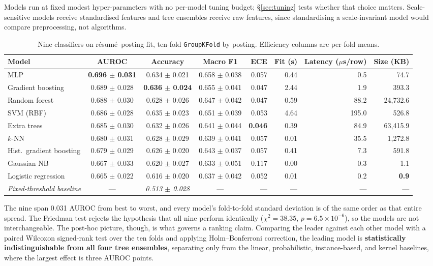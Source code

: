 Models run at fixed modest hyper-parameters with no per-model tuning budget;
\S\ref{sec:tuning} tests whether that choice matters. Scale-sensitive models
receive standardised features and tree ensembles receive raw features, since standardising a scale-invariant model would compare preprocessing, not algorithms.

\begin{table}[t]
\caption{Nine classifiers on résumé--posting fit, ten-fold \texttt{GroupKFold} by
posting. Efficiency columns are per-fold means.}
\label{tab:ninemodel}
\small
\begin{tabular}{@{}lcccrrrr@{}}
\toprule
Model & AUROC & Accuracy & Macro F1 & ECE & Fit (s) & Latency ($\mu$s/row) & Size (KB) \\
\midrule
MLP                      & \textbf{0.696 $\pm$ 0.031} & 0.634 $\pm$ 0.021 & 0.658 $\pm$ 0.038 & 0.057 & 0.44 & 0.5 & 74.7 \\
Gradient boosting        & 0.689 $\pm$ 0.028 & \textbf{0.636 $\pm$ 0.024} & 0.655 $\pm$ 0.041 & 0.047 & 2.44 & 1.9 & 393.3 \\
Random forest            & 0.688 $\pm$ 0.030 & 0.628 $\pm$ 0.026 & 0.647 $\pm$ 0.042 & 0.047 & 0.59 & 88.2 & 24{,}732.6 \\
SVM (RBF)                & 0.686 $\pm$ 0.028 & 0.635 $\pm$ 0.023 & 0.651 $\pm$ 0.039 & 0.053 & 4.64 & 195.0 & 526.8 \\
Extra trees              & 0.685 $\pm$ 0.030 & 0.632 $\pm$ 0.026 & 0.641 $\pm$ 0.044 & \textbf{0.046} & 0.39 & 84.9 & 63{,}415.9 \\
$k$-NN                   & 0.680 $\pm$ 0.031 & 0.628 $\pm$ 0.029 & 0.639 $\pm$ 0.041 & 0.057 & 0.01 & 35.5 & 1{,}272.8 \\
Hist.\ gradient boosting & 0.679 $\pm$ 0.029 & 0.626 $\pm$ 0.020 & 0.643 $\pm$ 0.037 & 0.057 & 0.41 & 7.3 & 591.8 \\
Gaussian NB              & 0.667 $\pm$ 0.033 & 0.620 $\pm$ 0.027 & 0.633 $\pm$ 0.051 & 0.117 & 0.00 & 0.3 & 1.1 \\
Logistic regression      & 0.665 $\pm$ 0.022 & 0.616 $\pm$ 0.020 & 0.637 $\pm$ 0.042 & 0.052 & 0.01 & 0.2 & \textbf{0.9} \\
\midrule
\emph{Fixed-threshold baseline} & --- & \emph{0.513 $\pm$ 0.028} & --- & --- & --- & --- & --- \\
\bottomrule
\end{tabular}
\end{table}

The nine span 0.031 AUROC from best to worst, and every model's fold-to-fold
standard deviation is of the same order as that entire spread. The Friedman test
rejects the hypothesis that all nine perform identically ($\chi^2 = 38.35$,
$p = 6.5 \times 10^{-6}$), so the models are not interchangeable. The post-hoc picture, though, is what governs a ranking claim. Comparing the leader against
each other model with a paired Wilcoxon signed-rank test over the ten folds and
applying Holm--Bonferroni correction, the leading model is \textbf{statistically
indistinguishable from all four tree ensembles}, separating only from the linear,
probabilistic, instance-based, and kernel baselines, where the largest effect is
three AUROC points.

